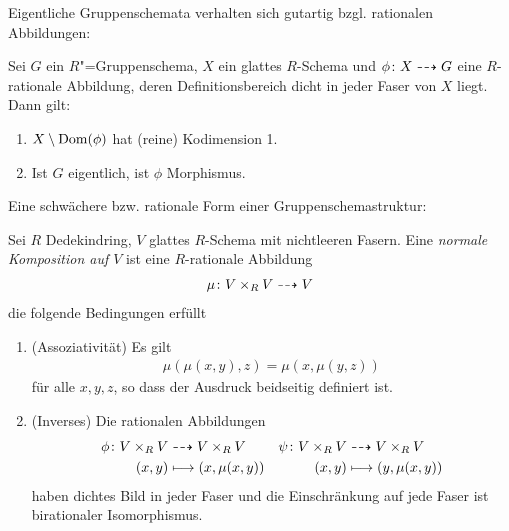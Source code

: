\documentclass[german]{scrreprt}
\begin{document}
Eigentliche Gruppenschemata verhalten sich gutartig bzgl. rationalen
Abbildungen: 
\begin{Lemma}\label{thm:rationalzumorphismus}
  Sei $G$ ein $R$"=Gruppenschema, $X$ ein glattes $R$-Schema und
  $\phi\colon X\dashrightarrow G$ eine $R$-rationale Abbildung, deren
  Definitionsbereich dicht in jeder Faser von $X$ liegt.
  Dann gilt:
  \begin{enumerate}[label=(\roman*)]
  \item $X\setminus \operatorname{Dom}(\phi)$ hat (reine) Kodimension 1.
  \item Ist $G$ eigentlich, ist $\phi$ Morphismus.
  \end{enumerate}
  \cite[Proposition IV.6.2]{silverman2}
\end{Lemma}


Eine schwächere bzw. rationale Form einer Gruppenschemastruktur:
\begin{Definition}\label{def:normalekomposition}
  Sei $R$ Dedekindring, $V$ glattes $R$-Schema mit nichtleeren Fasern.
  Eine \emph{normale Komposition auf $V$} ist eine $R$-rationale
  Abbildung
  \begin{gather*}
    \mu\colon V\times_R V\dashrightarrow V
  \end{gather*}
  die folgende Bedingungen erfüllt
  \begin{enumerate}[label=(\alph*)]
  \item (Assoziativität) Es gilt
    \begin{gather*}
      \mu(\mu(x,y),z)=\mu(x,\mu(y,z))
    \end{gather*}
    für alle $x,y,z$, so dass der Ausdruck beidseitig definiert ist.
  \item (Inverses)
    Die rationalen Abbildungen
    \begin{align*}
      \phi\colon V\times_R V
      &\dashrightarrow V\times_R V
      &\psi\colon V\times_R V
      & \dashrightarrow V\times_R V\\
      (x,y)
      &\longmapsto (x,\mu(x,y))
      &(x,y)
      &\longmapsto (y,\mu(x,y))       
    \end{align*}
    haben dichtes Bild in jeder Faser und die Einschränkung auf jede
    Faser ist birationaler Isomorphismus.
  \end{enumerate}
\end{Definition}
\end{document}
